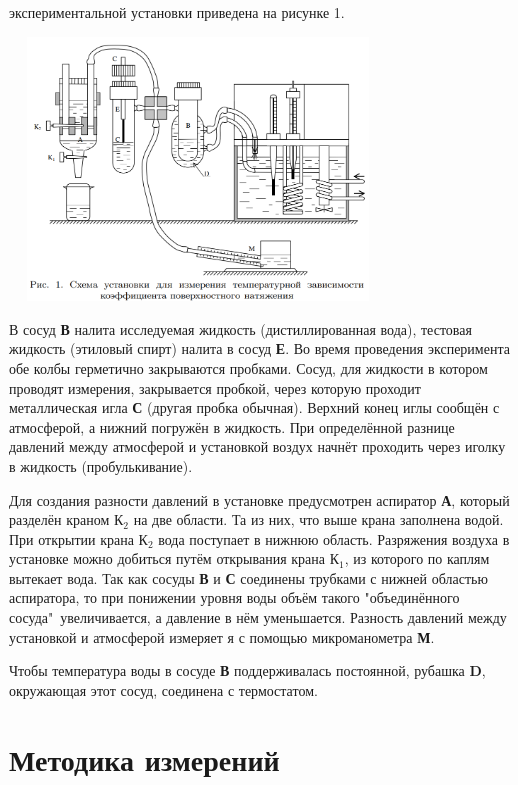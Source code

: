 \documentclass[15pt,a5paper,reqno]{article}
\begin{document}
     экспериментальной установки приведена на рисунке 1.
    
    \includegraphics[width = 10cm, height = 7cm]{Рисунок 1.png}
    
    В сосуд \textbf{В} налита исследуемая жидкость (дистиллированная вода), тестовая жидкость (этиловый спирт) налита в сосуд \textbf{Е}. Во время проведения эксперимента обе колбы герметично закрываются пробками. Сосуд, для жидкости в котором проводят измерения, закрывается пробкой, через которую проходит металлическая игла \textbf{С} (другая пробка обычная). Верхний конец иглы сообщён с атмосферой, а нижний погружён в жидкость. При определённой разнице давлений между атмосферой и установкой воздух начнёт проходить через иголку в жидкость (пробулькивание).
    
    Для создания разности давлений в установке предусмотрен аспиратор \textbf{А}, который разделён краном $\textbf{К}_2$ на две области. Та из них, что выше крана заполнена водой. При открытии крана $\textbf{К}_2$ вода поступает в нижнюю область. Разряжения воздуха в установке можно добиться путём открывания крана $\textbf{К}_1$, из которого по каплям вытекает вода. Так как сосуды \textbf{В} и \textbf{С} соединены трубками с нижней областью аспиратора, то при понижении уровня воды объём такого "объединённого сосуда"\ увеличивается, а давление в нём уменьшается. Разность давлений между установкой и атмосферой измеряет я с помощью микроманометра \textbf{М}.
    
    Чтобы температура воды в сосуде \textbf{В} поддерживалась постоянной, рубашка \textbf{D}, окружающая этот сосуд, соединена с термостатом. 
    
\section{Методика измерений}	
\end{document}
